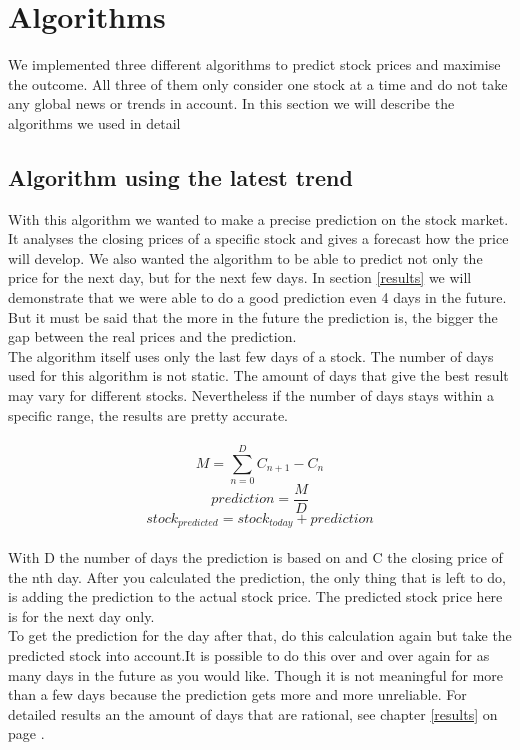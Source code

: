 \documentclass[conference]{IEEEtran}
\begin{document}

\section{Algorithms}
\label{algorithm}

We implemented three different algorithms to predict stock prices and maximise the outcome. All three of them only consider one stock at a time and do not take any global news or trends in account. In this section we will describe the algorithms we used in detail

\subsection{Algorithm using the latest trend}

With this algorithm we wanted to make a precise prediction on the stock market. It analyses the closing prices of a specific stock and gives a forecast how the price will develop. We also wanted the algorithm to be able to predict not only the price for the next day, but for the next few days. In section \ref{results} we will demonstrate that we were able to do a good prediction even 4 days in the future. But it must be said that the more in the future the prediction is, the bigger the gap between the real prices and the prediction.
\\
The algorithm itself uses only the last few days of a stock. The number of days used for this algorithm is not static. The amount of days that give the best result may vary for different stocks. Nevertheless if the number of days stays within a specific range, the results are pretty accurate.
\\
\\
\[ M = \sum_{n=0}^D C_{n+1} - C_{n} \]
\[ prediction = \frac{M}{D}\]
\[ stock_{predicted} = stock_{today} + prediction\]
\\
With D the number of days the prediction is based on and C the closing price of the nth day. After you calculated the prediction, the only thing that is left to do, is adding the prediction to the actual stock price. The predicted stock price here is for the next day only. 
\\
To get the prediction for the day after that, do this calculation again but take the predicted stock into account.It is possible to do this over and over again for as many days in the future as you would like. Though it is not meaningful for more than a few days because the prediction gets more and more unreliable. For detailed results an the amount of days that are rational, see chapter \ref{results} on page \pageref{results}.
\end{document}
